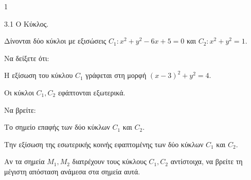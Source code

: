 \begin{ylh}{1}
    \item 3.1 Ο Κύκλος.
\end{ylh}
Δίνονται δύο κύκλοι με εξισώσεις $C_1: x^2 + y^2 - 6x + 5 = 0$ και $C_2: x^2 + y^2 = 1$.
\begin{alist}
\item Να δείξετε ότι:
    \begin{rlist}
    \item Η εξίσωση του κύκλου $C_1$ γράφεται στη μορφή $(x - 3)^2 + y^2 = 4$. 
    \item Οι κύκλοι $C_1, C_2$ εφάπτονται εξωτερικά. 
    \end{rlist}
\item Να βρείτε:
    \begin{rlist}
    \item Το σημείο επαφής των δύο κύκλων $C_1$ και $C_2$. 
    \item Την εξίσωση της εσωτερικής κοινής εφαπτομένης των δύο κύκλων $C_1$ και $C_2$. 
    \end{rlist}
\item Αν τα σημεία $M_1, M_2$ διατρέχουν τους κύκλους $C_1, C_2$ αντίστοιχα, να βρείτε τη μέγιστη απόσταση ανάμεσα στα σημεία αυτά. 
\end{alist}